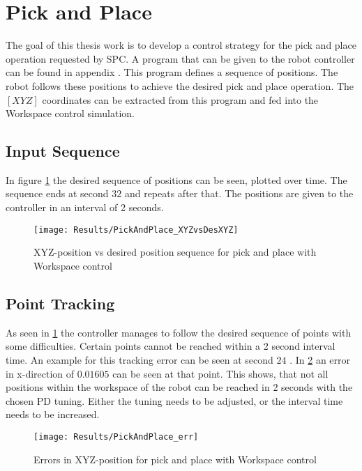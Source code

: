 
\section{Pick and Place}
The goal of this thesis work is to develop a control strategy for the pick and place operation requested by SPC. A program that can be given to the robot controller can be found in appendix .
This program defines a sequence of positions. The robot follows these positions to achieve the desired pick and place operation.
The $ [XYZ] $ coordinates can be extracted from this program and fed into the Workspace control simulation.

\subsection{Input Sequence}
In figure \ref{fig:PickAndPlace_XYZvsDesXYZ} the desired sequence of positions can be seen, plotted over time. The sequence ends at second $32$ and repeats after that. The positions are given to the controller in an interval of 2 seconds.

\begin{figure}[H]
	\texttt{[image: Results/PickAndPlace\_XYZvsDesXYZ]}
	\caption{XYZ-position vs desired position sequence for pick and place with Workspace control}
	\label{fig:PickAndPlace_XYZvsDesXYZ}
\end{figure}


\subsection{Point Tracking}
As seen in \cref{fig:PickAndPlace_XYZvsDesXYZ} the controller manages to follow the desired sequence of points with some difficulties. Certain points cannot be reached within a 2 second interval time. An example for this tracking error can be seen at second $24$ . In \cref{fig:PickAndPlace_err} an error in x-direction of $0.01605$ can be seen at that point. 
This shows, that not all positions within the workspace of the robot can be reached in 2 seconds with the chosen PD tuning.
Either the tuning needs to be adjusted, or the interval time needs to be increased.

\begin{figure}[H]
	\texttt{[image: Results/PickAndPlace\_err]}
	\caption{Errors in XYZ-position for pick and place with Workspace control}
	\label{fig:PickAndPlace_err}
\end{figure}



